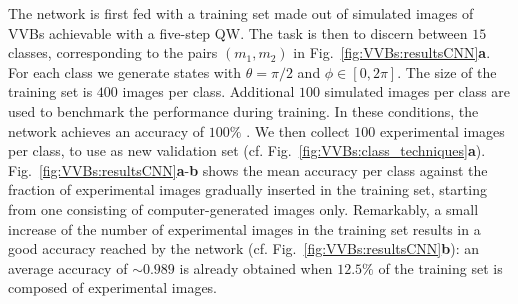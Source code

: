 The network is first fed with a training set made out of simulated images of \acp{VVB} achievable with a five-step \ac{QW}.
The task is then to discern between $15$ classes, corresponding to the pairs $(m_1,m_2)$ in Fig.~\ref{fig:VVBs:resultsCNN}\textbf{a}.
For each class we generate states with $\theta=\pi/2$ and $\phi\in[0,2\pi]$. The size of the training set is $400$ images per class. Additional $100$ simulated images per class are used to benchmark the performance during training. In these conditions, the network achieves an accuracy of $100\%$ . 
We then collect $100$ experimental images per class, to use as new validation set (cf. Fig.~\ref{fig:VVBs:class_techniques}{\bf a}). Fig.~\ref{fig:VVBs:resultsCNN}{\bf a}-{\bf b} shows the mean accuracy per class against the fraction of experimental images gradually inserted in the training set, starting from one consisting of computer-generated images only.
Remarkably, a small increase of the number of experimental images in the training set results in a good accuracy reached by the network (cf. Fig.~\ref{fig:VVBs:resultsCNN}{\bf b}): an average accuracy of $\sim 0.989$ is already obtained when $12.5\%$ of the training set is composed of experimental images.



